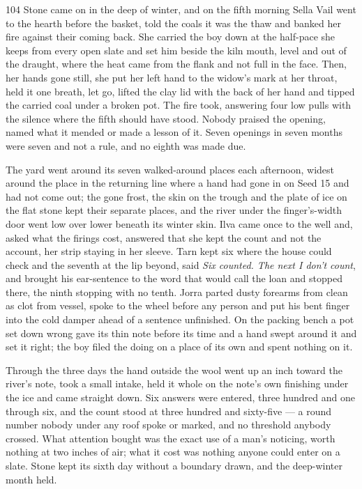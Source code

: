 \begin{CRchronicle}{104}
Stone came on in the deep of winter, and on the fifth morning Sella Vail went to the hearth before the basket, told the coals it was the thaw and banked her fire against their coming back. She carried the boy down at the half-pace she keeps from every open slate and set him beside the kiln mouth, level and out of the draught, where the heat came from the flank and not full in the face. Then, her hands gone still, she put her left hand to the widow’s mark at her throat, held it one breath, let go, lifted the clay lid with the back of her hand and tipped the carried coal under a broken pot. The fire took, answering four low pulls with the silence where the fifth should have stood. Nobody praised the opening, named what it mended or made a lesson of it. Seven openings in seven months were seven and not a rule, and no eighth was made due.

The yard went around its seven walked-around places each afternoon, widest around the place in the returning line where a hand had gone in on Seed 15 and had not come out; the gone frost, the skin on the trough and the plate of ice on the flat stone kept their separate places, and the river under the finger’s-width door went low over lower beneath its winter skin. Ilva came once to the well and, asked what the firings cost, answered that she kept the count and not the account, her strip staying in her sleeve. Tarn kept six where the house could check and the seventh at the lip beyond, said \emph{Six counted. The next I don’t count}, and brought his ear-sentence to the word that would call the loan and stopped there, the ninth stopping with no tenth. Jorra parted dusty forearms from clean as clot from vessel, spoke to the wheel before any person and put his bent finger into the cold damper ahead of a sentence unfinished. On the packing bench a pot set down wrong gave its thin note before its time and a hand swept around it and set it right; the boy filed the doing on a place of its own and spent nothing on it.

Through the three days the hand outside the wool went up an inch toward the river’s note, took a small intake, held it whole on the note’s own finishing under the ice and came straight down. Six answers were entered, three hundred and one through six, and the count stood at three hundred and sixty-five --- a round number nobody under any roof spoke or marked, and no threshold anybody crossed. What attention bought was the exact use of a man’s noticing, worth nothing at two inches of air; what it cost was nothing anyone could enter on a slate. Stone kept its sixth day without a boundary drawn, and the deep-winter month held.
\end{CRchronicle}
